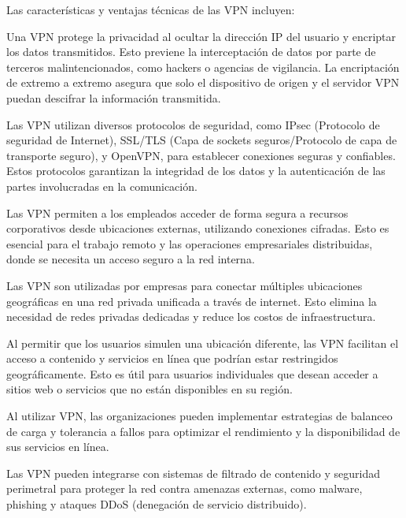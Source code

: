 Las características y ventajas técnicas de las VPN incluyen:

Una VPN protege la privacidad al ocultar la dirección IP del usuario y encriptar los datos transmitidos. Esto previene la interceptación de datos por parte de terceros malintencionados, como hackers o agencias de vigilancia. La encriptación de extremo a extremo asegura que solo el dispositivo de origen y el servidor VPN puedan descifrar la información transmitida.

Las VPN utilizan diversos protocolos de seguridad, como IPsec (Protocolo de seguridad de Internet), SSL/TLS (Capa de sockets seguros/Protocolo de capa de transporte seguro), y OpenVPN, para establecer conexiones seguras y confiables. Estos protocolos garantizan la integridad de los datos y la autenticación de las partes involucradas en la comunicación.

Las VPN permiten a los empleados acceder de forma segura a recursos corporativos desde ubicaciones externas, utilizando conexiones cifradas. Esto es esencial para el trabajo remoto y las operaciones empresariales distribuidas, donde se necesita un acceso seguro a la red interna.

Las VPN son utilizadas por empresas para conectar múltiples ubicaciones geográficas en una red privada unificada a través de internet. Esto elimina la necesidad de redes privadas dedicadas y reduce los costos de infraestructura.

Al permitir que los usuarios simulen una ubicación diferente, las VPN facilitan el acceso a contenido y servicios en línea que podrían estar restringidos geográficamente. Esto es útil para usuarios individuales que desean acceder a sitios web o servicios que no están disponibles en su región.

Al utilizar VPN, las organizaciones pueden implementar estrategias de balanceo de carga y tolerancia a fallos para optimizar el rendimiento y la disponibilidad de sus servicios en línea.

Las VPN pueden integrarse con sistemas de filtrado de contenido y seguridad perimetral para proteger la red contra amenazas externas, como malware, phishing y ataques DDoS (denegación de servicio distribuido).


 




